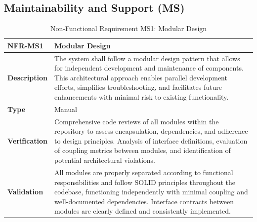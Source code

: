 \documentclass[12pt, titlepage]{article}
\begin{document}
\subsection{Maintainability and Support (MS)}
\begin{table}[H]
\centering
{}
\begin{tabular}{|p{3.5cm}|p{11.5cm}|}
\hline
\rowcolor{gray!30}
\textbf{NFR-MS1} & \textbf{Modular Design} \\
\hline
\textbf{Description} & The system shall follow a modular design pattern that allows for independent development and maintenance of components. This architectural approach enables parallel development efforts, simplifies troubleshooting, and facilitates future enhancements with minimal risk to existing functionality. \\
\hline
\textbf{Type} & Manual \\
\hline
\textbf{Verification} & Comprehensive code reviews of all modules within the repository to assess encapsulation, dependencies, and adherence to design principles. Analysis of interface definitions, evaluation of coupling metrics between modules, and identification of potential architectural violations. \\
\hline
\textbf{Validation} & All modules are properly separated according to functional responsibilities and follow SOLID principles throughout the codebase, functioning independently with minimal coupling and well-documented dependencies. Interface contracts between modules are clearly defined and consistently implemented. \\
\hline
\end{tabular}
\caption{Non-Functional Requirement MS1: Modular Design}
\end{table}
\end{document}
